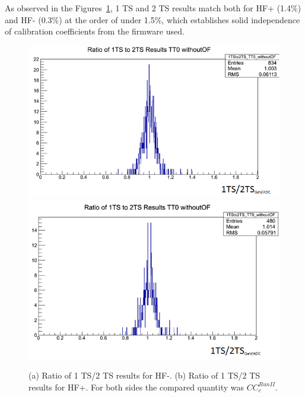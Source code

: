 As observed in the Figures~\ref{fig:HF_1TSto2TS},
1 TS and 2 TS results match both for HF+ (1.4\%) and HF- (0.3\%) at the order of under 1.5\%, which establishes solid independence of calibration coefficients from the firmware used.
\begin{figure}[htb]
  \centering
  \includegraphics[width=0.45\linewidth]{figures/ch_hfcalibration/HFM_1TSto2TS_woOF.png}
  \includegraphics[width=0.45\linewidth]{figures/ch_hfcalibration/HFP_1TSto2TS_woOF.png}
  \caption
        {(a) Ratio of 1 TS/2 TS results for HF-.
         (b) Ratio of 1 TS/2 TS results for HF+.
         For both sides the compared quantity was ${CC}^{Run II}_{c}$.}
  \label{fig:HF_1TSto2TS}
\end{figure}

